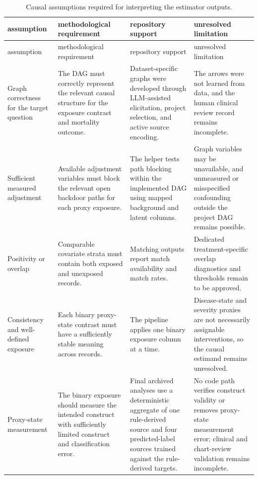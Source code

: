 \begin{longtable}{@{}L{0.16\textwidth}L{0.25\textwidth}L{0.22\textwidth}L{0.27\textwidth}@{}}
\caption[Causal assumptions and interpretation boundaries.]{Causal assumptions required for interpreting the estimator outputs.}
\label{tab:causal-assumptions}\\
\toprule
assumption & methodological requirement & repository support & unresolved limitation \\
\midrule
\endfirsthead
\toprule
assumption & methodological requirement & repository support & unresolved limitation \\
\midrule
\endhead
Graph correctness for the target question & The DAG must correctly represent the relevant causal structure for the exposure contrast and mortality outcome. & Dataset-specific graphs were developed through LLM-assisted elicitation, project selection, and active source encoding. & The arrows were not learned from data, and the human clinical review record remains incomplete. \\
Sufficient measured adjustment & Available adjustment variables must block the relevant open backdoor paths for each proxy exposure. & The helper tests path blocking within the implemented DAG using mapped background and latent columns. & Graph variables may be unavailable, and unmeasured or misspecified confounding outside the project DAG remains possible. \\
Positivity or overlap & Comparable covariate strata must contain both exposed and unexposed records. & Matching outputs report match availability and match rates. & Dedicated treatment-specific overlap diagnostics and thresholds remain to be approved. \\
Consistency and well-defined exposure & Each binary proxy-state contrast must have a sufficiently stable meaning across records. & The pipeline applies one binary exposure column at a time. & Disease-state and severity proxies are not necessarily assignable interventions, so the causal estimand remains unresolved. \\
Proxy-state measurement & The binary exposure should measure the intended construct with sufficiently limited construct and classification error. & Final archived analyses use a deterministic aggregate of one rule-derived source and four predicted-label sources trained against the rule-derived targets. & No code path verifies construct validity or removes proxy-state measurement error; clinical and chart-review validation remains incomplete. \\

\end{longtable}
